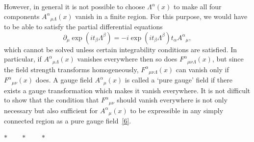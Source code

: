 However, in general it is not possible to choose $\Lambda^\alpha(x)$ to make all
four components $A^\alpha{}_{\mu\Lambda}(x)$ vanish in a finite region. For this
purpose, we would have to be able to satisfy the partial differential equations
\begin{equation}
 \partial_\mu\exp(it_\beta\Lambda^\beta)
 =-i\exp(it_\beta\Lambda^\beta)t_\alpha A^\alpha{}_\mu ,
 \tag{15.1.19}\label{eq:15.1.19}
\end{equation}
which cannot be solved unless certain integrability conditions are satisfied. In
particular, if $A^\alpha{}_{\mu\Lambda}(x)$ vanishes everywhere then so does
$F^\alpha{}_{\mu\nu\Lambda}(x)$, but since the field strength transforms
homogeneously, $F^\alpha{}_{\mu\nu\Lambda}(x)$ can vanish only if
$F^\alpha{}_{\mu\nu}(x)$ does. A gauge field $A^\alpha{}_\mu(x)$ is called a
`pure gauge' field if there exists a gauge transformation which makes it vanish
everywhere. It is not difficult to show that the condition that
$F^\alpha{}_{\mu\nu}$ should vanish everywhere is not only necessary but also
sufficient for $A^\alpha{}_\mu(x)$ to be expressible in any simply connected
region as a pure gauge field~\hyperref[ch15-ref-6]{[6]}.

\begin{center}
$*\qquad *\qquad *$
\end{center}

